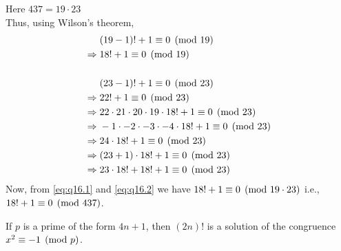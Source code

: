\documentclass[12pt,class=book,crop=false]{standalone}
\begin{document}
\begin{soln}
    Here $ 437=19\cdot 23 $\\
    Thus, using Wilson's theorem,
    \begin{align}
        &(19-1)!+1\equiv 0\pmod{19}\notag\\
        \Rightarrow\;&18!+1\equiv 0 \pmod{19}\label{eq:q16.1}\\
        &\notag\\
        &(23-1)!+1\equiv 0 \pmod{23}\notag\\
        \Rightarrow\;&22!+1\equiv 0 \pmod{23}\notag\\
        \Rightarrow\;&22\cdot21\cdot20\cdot19\cdot18!+1\equiv 0 \pmod{23}\notag\\
        \Rightarrow\;&-1\cdot -2\cdot -3\cdot -4\cdot 18!+1\equiv 0 \pmod{23}\notag\\
        \Rightarrow\;&24\cdot 18!+1\equiv 0 \pmod{23}\notag\\
        \Rightarrow\;&(23+1)\cdot 18!+1\equiv 0 \pmod{23}\notag\\
        \Rightarrow\;&23\cdot18! +18!+1\equiv 0 \pmod{23}\label{eq:q16.2}
    \end{align}
    Now, from \eqref{eq:q16.1} and \eqref{eq:q16.2} we have $ 18!+1\equiv 0 \pmod{19\cdot23} $ i.e., $ 18!+1\equiv 0 \pmod{437} $.
\end{soln}
\begin{qn}
    If $ p $ is a prime of the form $ 4n+1 $, then $ (2n)! $ is a solution of the congruence $ x^2\equiv -1 \pmod{p} $.
\end{qn}
\end{document}
